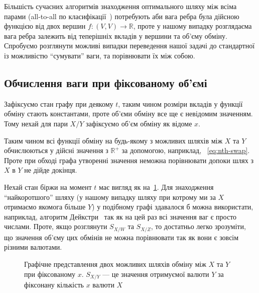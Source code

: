 \documentclass[14pt]{extarticle}
\begin{document}
Більшість сучасних алгоритмів знаходження оптимального шляху між всіма парами
(all-to-all по класифікації~\cite{deo1980shortest}) потребують аби вага ребра
була дійсною функцією від двох вершин $f: (V, V) \to \mathbb{R}$, проте у нашому випадку
розглядаєма вага ребра залежить від теперішніх вкладів у вершини та об'єму
обміну. Спробуємо розглянути можливі випадки переведення нашої задачі до
стандартної із можливістю ``сумувати'' ваги, та порівнювати їх між собою.

\subsection{Обчислення ваги при фіксованому об'ємі}\label{sec:weight-non-fixed}

Зафіксуємо стан графу при деякому $t$, таким чином розміри вкладів у функції
обміну стають константами, проте об'єми обміну все ще є невідомим значенням.
Тому нехай для пари $X/Y$ зафіксуємо об'єм обміну як відоме $x$.

Таким чином всі функції обміну на будь-якому з можливих шляхів між $X$ та $Y$
обчислюються у дійсні значення з $\mathbb{R}^{+}$ за допомогою, наприклад,
~\eqref{eq:nth-swap}. Проте при обході графа утворенні значення неможна
порівнювати допоки шлях з $X$ в $Y$ не дійде докінця.

Нехай стан біржи на момент $t$ має вигляд як на~\ref{fig:eval-func-graph}. Для
знаходження ``найкоротшого'' шляху (у нашому випадку шляху при котрому ми за $X$
отримаємо якомога більше $Y$) у подібному графі здавалося б можна використати,
наприклад, алгоритм Дейкстри~\cite{dijkstra} так як на цей раз всі значення ваг
є просто числами. Проте, якщо розглянути $S_{X/W}$ та $S_{X/Z}$, то достатньо
легко зрозуміти, що значення об'єму цих обмінів не можна порівнювати так як вони
є зовсім різними валютами.

\begin{figure}[h]
	\centering
	\caption{Графічне представлення двох можливих шляхів обміну між $X$ та $Y$
		при фіксованому $x$. $S_{X/Y}$ --- це значення отримуємої валюти $Y$ за
		фіксонану кількість $x$ валюти $X$}\label{fig:eval-func-graph}
\end{figure}
\end{document}
